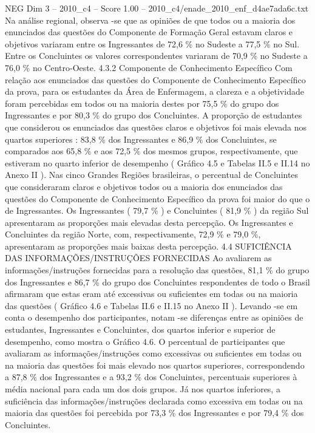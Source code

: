\begin{textsample}{NEG Dim 3 – 2010\_c4 – Score 1.00 – 2010\_c4/enade\_2010\_enf\_d4ae7ada6c.txt}
Na análise regional, observa -se que as opiniões de que todos ou a maioria dos enunciados das questões do Componente de Formação Geral estavam claros e objetivos variaram entre os Ingressantes de 72,6 \% no Sudeste a 77,5 \% no Sul.
Entre os Concluintes os valores correspondentes variaram de 70,9 \% no Sudeste a 76,0 \% no Centro-Oeste. 4.3.2 Componente de Conhecimento Específico Com relação aos enunciados das questões do Componente de Conhecimento Específico da prova, para os estudantes da Área de Enfermagem, a clareza e a objetividade foram percebidas em todos ou na maioria destes por 75,5 \% do grupo dos Ingressantes e por 80,3 \% do grupo dos Concluintes.
A proporção de estudantes que considerou os enunciados das questões claros e objetivos foi mais elevada nos quartos superiores : 83,8 \% dos Ingressantes e 86,9 \% dos Concluintes, se comparados aos 65,8 \% e aos 72,5 \% dos mesmos grupos, respectivamente, que estiveram no quarto inferior de desempenho ( Gráfico 4.5 e Tabelas II.5 e II.14 no Anexo II ).
Nas cinco Grandes Regiões brasileiras, o percentual de Concluintes que consideraram claros e objetivos todos ou a maioria dos enunciados das questões do Componente de Conhecimento Específico da prova foi maior do que o de Ingressantes.
Os Ingressantes ( 79,7 \% ) e Concluintes ( 81,9 \% ) da região Sul apresentaram as proporções mais elevadas desta percepção.
Os Ingressantes e Concluintes da região Norte, com, respectivamente, 72,9 \% e 79,0 \%, apresentaram as proporções mais baixas desta percepção. 4.4 SUFICIÊNCIA DAS INFORMAÇÕES/INSTRUÇÕES FORNECIDAS Ao avaliarem as informações/instruções fornecidas para a resolução das questões, 81,1 \% do grupo dos Ingressantes e 86,7 \% do grupo dos Concluintes respondentes de todo o Brasil afirmaram que estas eram até excessivas ou suficientes em todas ou na maioria das questões ( Gráfico 4.6 e Tabelas II.6 e II.15 no Anexo II ).
Levando -se em conta o desempenho dos participantes, notam -se diferenças entre as opiniões de estudantes, Ingressantes e Concluintes, dos quartos inferior e superior de desempenho, como mostra o Gráfico 4.6.
O percentual de participantes que avaliaram as informações/instruções como excessivas ou suficientes em todas ou na maioria das questões foi mais elevado nos quartos superiores, correspondendo a 87,8 \% dos Ingressantes e a 93,2 \% dos Concluintes, percentuais superiores à média nacional para cada um dos dois grupos.
Já nos quartos inferiores, a suficiência das informações/instruções declarada como excessiva em todas ou na maioria das questões foi percebida por 73,3 \% dos Ingressantes e por 79,4 \% dos Concluintes.

\end{textsample}
